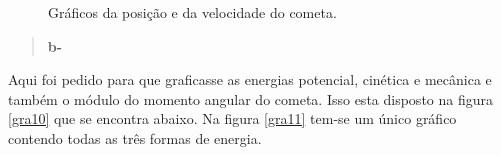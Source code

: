 \documentclass[a4wide]{report}
\begin{document}
\begin{figure}[!ht]
\centering
{}\qquad 
{}\qquad 
\caption{Gráficos da posição e da velocidade do cometa.}
\label{gra9}
\end{figure}

\newpage

\begin{quote}

\bf  b-

\end{quote}
Aqui foi pedido para que graficasse as energias potencial, cinética e mecânica e também o módulo do momento angular do cometa.
Isso esta disposto na figura \ref{gra10} que se encontra abaixo. Na figura \ref{gra11} tem-se um único gráfico contendo todas as três 
formas de energia.
\end{document}
